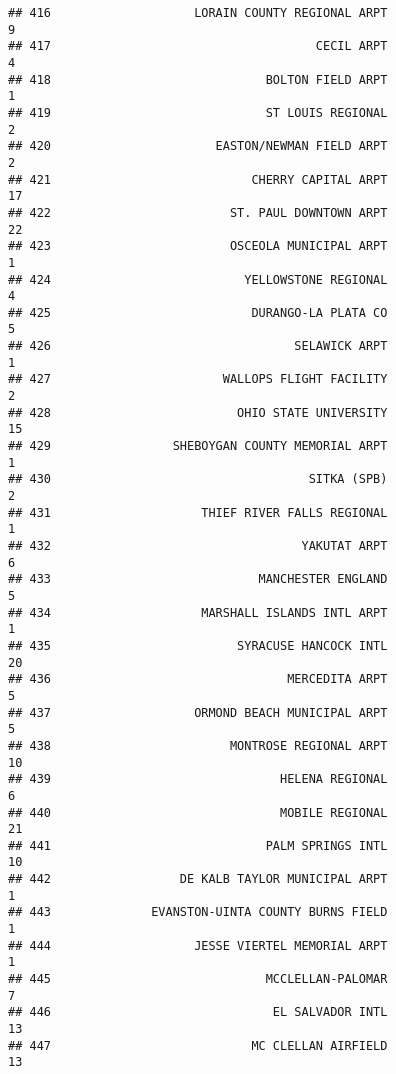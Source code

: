 \documentclass[
]{article}
\begin{document}
\begin{verbatim}
## 416                    LORAIN COUNTY REGIONAL ARPT                           9
## 417                                     CECIL ARPT                           4
## 418                              BOLTON FIELD ARPT                           1
## 419                              ST LOUIS REGIONAL                           2
## 420                       EASTON/NEWMAN FIELD ARPT                           2
## 421                            CHERRY CAPITAL ARPT                          17
## 422                         ST. PAUL DOWNTOWN ARPT                          22
## 423                         OSCEOLA MUNICIPAL ARPT                           1
## 424                           YELLOWSTONE REGIONAL                           4
## 425                            DURANGO-LA PLATA CO                           5
## 426                                  SELAWICK ARPT                           1
## 427                        WALLOPS FLIGHT FACILITY                           2
## 428                          OHIO STATE UNIVERSITY                          15
## 429                 SHEBOYGAN COUNTY MEMORIAL ARPT                           1
## 430                                    SITKA (SPB)                           2
## 431                     THIEF RIVER FALLS REGIONAL                           1
## 432                                   YAKUTAT ARPT                           6
## 433                             MANCHESTER ENGLAND                           5
## 434                     MARSHALL ISLANDS INTL ARPT                           1
## 435                          SYRACUSE HANCOCK INTL                          20
## 436                                 MERCEDITA ARPT                           5
## 437                    ORMOND BEACH MUNICIPAL ARPT                           5
## 438                         MONTROSE REGIONAL ARPT                          10
## 439                                HELENA REGIONAL                           6
## 440                                MOBILE REGIONAL                          21
## 441                              PALM SPRINGS INTL                          10
## 442                  DE KALB TAYLOR MUNICIPAL ARPT                           1
## 443              EVANSTON-UINTA COUNTY BURNS FIELD                           1
## 444                    JESSE VIERTEL MEMORIAL ARPT                           1
## 445                              MCCLELLAN-PALOMAR                           7
## 446                               EL SALVADOR INTL                          13
## 447                            MC CLELLAN AIRFIELD                          13

\end{verbatim}
\end{document}
